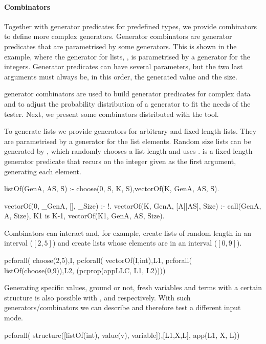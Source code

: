 \paragraph{\bf Combinators}

Together with generator predicates for predefined types, we
provide combinators to define more complex generators.
%
Generator combinators are generator predicates that are parametrised by
some generators.
%
This is shown in the example, where the generator for lists,
, is parametrised by a generator for the integers.
%
Generator predicates can have several parameters, but the two last
arguments must always be, in this order, the generated value and the
size.
%


\plqc{} generator combinators
are used to build generator predicates for complex data and to
adjust the probability distribution of a generator to fit the needs of
the tester.
%
Next, we present some combinators distributed with the tool.



%
To generate lists we provide generators for arbitrary and
fixed length lists.
%
They are parametrised by a generator for the list elements.
%
Random size lists can be generated by , which randomly
chooses a list length and uses . 
%
 is a fixed length generator predicate that recurs on
the integer given as the first argument, generating each element.
\begin{yapcode}
 listOf(GenA, AS, S) :- choose(0, S, K, S),vectorOf(K, GenA, AS, S).

 vectorOf(0, _GenA, [], _Size) :- !.
 vectorOf(K, GenA, [A||AS], Size) :-
   call(GenA, A, Size), K1 is K-1, vectorOf(K1, GenA, AS, Size).
\end{yapcode}
%
Combinators can interact and, for example, create lists of random length
in an interval ($[2,5]$) and create lists whose elements are in an
interval ($[0,9]$).
%
\begin{yapcode}
   pcforall( choose(2,5),I, pcforall( vectorOf(I,int),L1,
     pcforall( listOf(choose(0,9)),L2, (pcprop({appLLC, L1, L2}))))
\end{yapcode}


Generating specific values, ground or not, fresh variables and terms
with a certain structure is also possible with ,
 and  respectively.
%
With such generators/combinators we can describe and therefore test a
different input mode.
\begin{yapcode}
   pcforall( structure([listOf(int), value(v), variable]),[L1,X,L],
     app(L1, X, L))
\end{yapcode}


